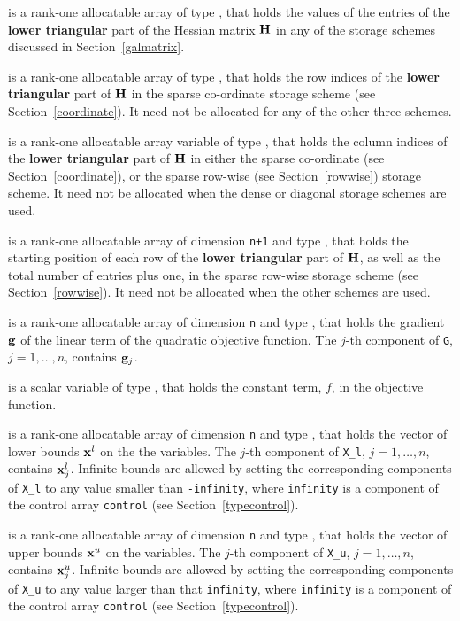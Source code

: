 \documentclass{galahad}
\begin{document}
\begin{description}
\begin{description}
 is a rank-one allocatable array of type \realdp, that holds
the values of the entries of the {\bf lower triangular} part
of the Hessian matrix ${\mathbf{H}}$ in any of the 
storage schemes discussed in Section~\ref{galmatrix}.

 is a rank-one allocatable array of type \integer,
that holds the row indices of the {\bf lower triangular} part of ${\mathbf{H}}$ 
in the sparse co-ordinate storage
scheme (see Section~\ref{coordinate}). 
It need not be allocated for any of the other three schemes.

 is a rank-one allocatable array variable of type \integer,
that holds the column indices of the {\bf lower triangular} part of 
${\mathbf{H}}$ in either the sparse co-ordinate 
(see Section~\ref{coordinate}), or the sparse row-wise 
(see Section~\ref{rowwise}) storage scheme.
It need not be allocated when the dense or diagonal storage schemes are used.

 is a rank-one allocatable array of dimension {\tt n+1} and type 
\integer, that holds the starting position of 
each row of the {\bf lower triangular} part of ${\mathbf{H}}$, as well
as the total number of entries plus one, in the sparse row-wise storage
scheme (see Section~\ref{rowwise}). It need not be allocated when the
other schemes are used.

\end{description}

 is a rank-one allocatable array of dimension {\tt n} and type 
\realdp, that holds the gradient ${\mathbf{g}}$ 
of the linear term of the quadratic objective function.
The $j$-th component of 
{\tt G}, $j = 1,  \ldots ,  n$, contains ${\mathbf{g}}_{j}$.

 is a scalar variable of type 
\realdp, that holds 
the constant term, $f$, in the objective function.

 is a rank-one allocatable array of dimension {\tt n} and type 
\realdp, that holds
the vector of lower bounds ${\mathbf{x}}^{l}$ on the the variables.
The $j$-th component of {\tt X\_l}, $j = 1, \ldots , n$, 
contains ${\mathbf{x}}_{j}^{l}$.
Infinite bounds are allowed by setting the corresponding 
components of {\tt X\_l} to any value smaller than {\tt -infinity}, 
where {\tt infinity} is a component of the control array {\tt control} 
(see Section~\ref{typecontrol}).

 is a rank-one allocatable array of dimension {\tt n} and type 
\realdp, that holds
the vector of upper bounds ${\mathbf{x}}^{u}$ on the variables.
The $j$-th component of {\tt X\_u}, $j = 1, \ldots , n$, 
contains ${\mathbf{x}}_{j}^{u}$.
Infinite bounds are allowed by setting the corresponding 
components of {\tt X\_u} to any value larger than that {\tt infinity}, 
where {\tt infinity} is a component of the control array {\tt control} 
(see Section~\ref{typecontrol}).


\end{description}
\end{document}
